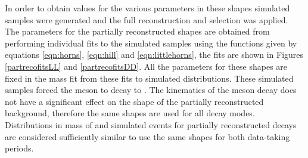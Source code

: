 \begin{table}[h]
\centering
{}
\caption{Different partially reconstructed shapes and \Dstar helicity states and how this relates to the dependence on the helicity angle and the \B mass parameterisation. The kinematic endpoints $a_i$ and $b_i$ are allowed to be different for each of the partially reconstructed shapes.}
\label{helicityamplitudes}
\end{table}

In order to obtain values for the various parameters in these shapes simulated samples were generated and the full reconstruction and selection was applied. The parameters for the partially reconstructed shapes are obtained from performing individual fits to the simulated samples using the functions given by equations \ref{eqn:horns}, \ref{eqn:hill} and \ref{eqn:littlehorns}, the fits are shown in Figures \ref{partrecofitsLL} and \ref{partrecofitsDD}. All the parameters for these shapes are fixed in the mass fit from these fits to simulated distributions. These simulated samples forced the \Dz meson to decay to \Km\pip. The kinematics of the \Dz meson decay does not have a significant effect on the shape of the partially reconstructed background, therefore the same shapes are used for all \Dz decay modes. Distributions in \Bm mass of \runone and \runtwo simulated events for partially reconstructed decays are considered sufficiently similar to use the same shapes for both data-taking periods.


